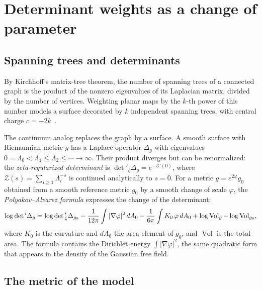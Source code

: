 \section{Determinant weights as a change of parameter}\label{sec:tilt}

\subsection{Spanning trees and determinants}

By Kirchhoff's matrix-tree theorem, the number of spanning trees of a connected graph is the
product of the nonzero eigenvalues of its Laplacian matrix, divided by the number of vertices. Weighting
planar maps by the $k$-th power of this number models a surface decorated by $k$ independent
spanning trees, with central charge $c=-2k$~\cite{PaperA}.

The continuum analog replaces the graph by a surface. A smooth surface with Riemannian metric $g$
has a Laplace operator $\Delta_g$ with eigenvalues
$0=\Lambda_0<\Lambda_1\le\Lambda_2\le\cdots\to\infty$. Their product diverges but can be
renormalized: the \emph{zeta-regularized determinant} is $\det{}'_\zeta\Delta_g=e^{-\mathcal Z'(0)}$,
where $\mathcal Z(s)=\sum_{i\ge1}\Lambda_i^{-s}$ is continued analytically to $s=0$. For a metric $g=e^{2\varphi}g_0$ obtained from a smooth
reference metric $g_0$ by a smooth change of scale $\varphi$, the \emph{Polyakov--Alvarez formula}
expresses the change of the determinant:
\begin{equation}\label{eq:PA}
\log\det{}'\Delta_g=\log\det{}'_\zeta\Delta_{g_0}-\frac1{12\pi}\int|\nabla\varphi|^2\,dA_0
-\frac1{6\pi}\int K_0\,\varphi\,dA_0+\log\operatorname{Vol}_g-\log\operatorname{Vol}_{g_0},
\end{equation}
where $K_0$ is the curvature and $dA_0$ the area element of $g_0$, and $\operatorname{Vol}$ is the
total area. The formula contains the Dirichlet energy $\int|\nabla\varphi|^2$, the same quadratic
form that appears in the density of the Gaussian free field.

\subsection{The metric of the model}

